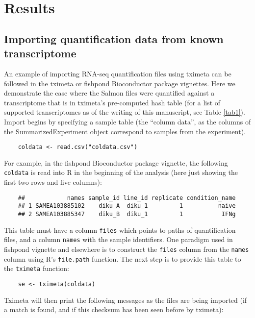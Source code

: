 \documentclass[12pt]{article} \usepackage[utf8]{inputenc}
\begin{document}
\section*{Results}

\subsection*{Importing quantification data from known transcriptome}

An example of importing RNA-seq quantification files using tximeta can
be followed in the tximeta or fishpond Bioconductor package
vignettes. Here we demonstrate the case where the Salmon files were
quantified against a transcriptome that is in tximeta's pre-computed
hash table (for a list of supported transcriptomes as of the writing
of this manuscript, see Table \ref{tab1}). Import begins by specifying
a sample table (the ``column data'', as the columns of the
SummarizedExperiment object correspond to samples from the
experiment).

\begin{verbatim}
    coldata <- read.csv("coldata.csv")
\end{verbatim}

For example, in the fishpond Bioconductor package vignette, the
following \texttt{coldata} is read into R in the beginning of the
analysis (here just showing the first two rows and five columns):

\begin{verbatim}
    ##            names sample_id line_id replicate condition_name
    ## 1 SAMEA103885102    diku_A  diku_1         1          naive
    ## 2 SAMEA103885347    diku_B  diku_1         1           IFNg
\end{verbatim}

This table must have a column \texttt{files} which points to paths of
quantification files, and a column \texttt{names} with the sample
identifiers. One paradigm used in fishpond vignette and elsewhere is
to construct the \texttt{files} column from the \texttt{names} column
using R's \texttt{file.path} function. The next step is to provide
this table to the \texttt{tximeta} function:

\begin{verbatim}
    se <- tximeta(coldata)
\end{verbatim}

Tximeta will then print the following messages as the files are being
imported (if a match is found, and if this checksum has been seen
before by tximeta):
\end{document}

